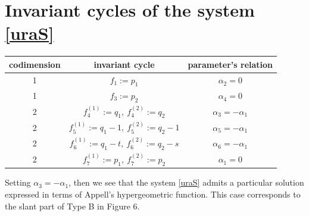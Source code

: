 \section{Invariant cycles of the system \eqref{uraS}}

\begin{center}
\begin{tabular}{|c|c|c|} \hline
codimension & invariant cycle & parameter's relation \\ \hline
1 & $f_1:=p_1$ & $\alpha_2=0$  \\ \hline
1 & $f_3:=p_2$ & $\alpha_4=0$  \\ \hline
2 & $f_4^{(1)}:=q_1, \ f_4^{(2)}:=q_2$ & $\alpha_3=-\alpha_1$  \\ \hline
2 & $f_5^{(1)}:=q_1-1, \ f_5^{(2)}:=q_2-1$ & $\alpha_5=-\alpha_1$   \\ \hline
2 & $f_6^{(1)}:=q_1-t, \ f_6^{(2)}:=q_2-s$ & $\alpha_6=-\alpha_1$   \\ \hline
2 & $f_7^{(1)}:=p_1, \ f_7^{(2)}:=p_2$ & $\alpha_1=0$   \\ \hline
\end{tabular}
\end{center}
Setting $\alpha_3=-\alpha_1$, then we see that the system \eqref{uraS} admits a particular solution expressed in terms of Appell's hypergeometric function. This case corresponds to the slant part of Type B in Figure 6.





